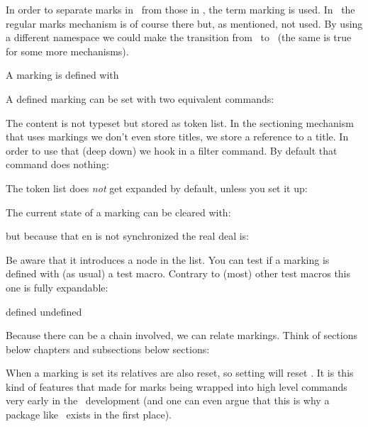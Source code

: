In order to separate marks in \CONTEXT\ from those in \TEX, the term \quote
{marking} is used. In \MKIV\ the regular marks mechanism is of course there but,
as mentioned, not used. By using a different namespace we could make the
transition from \MKII\ to \MKIV\ (the same is true for some more mechanisms).

A marking is defined with

\starttyping[option=TEX]
\stoptyping

A defined marking can be set with two equivalent commands:

\starttyping[option=TEX]
\stoptyping

The content is not typeset but stored as token list. In the sectioning mechanism
that uses markings we don't even store titles, we store a reference to a title.
In order to use that (deep down) we hook in a filter command. By default that command
does nothing:

\starttyping[option=TEX]
\setupmarking[MyMark][filtercommand=\firstofoneargument]
\stoptyping

The token list does {\em not} get expanded by default, unless you set it up:

\starttyping[option=TEX]
\setupmarking[MyMark][expansion=yes]
\stoptyping

The current state of a marking can be cleared with:

\starttyping[option=TEX]
\clearmarking[MyMark]
\stoptyping

but because that en is not synchronized the real deal is:

\starttyping[option=TEX]
\resetmarking[MyMark]
\stoptyping

Be aware that it introduces a node in the list. You can test if a marking is
defined with (as usual) a test macro. Contrary to (most) other test macros this
one is fully expandable:

\starttyping[option=TEX]
 {
    defined
} {
    undefined
}
\stoptyping

Because there can be a chain involved, we can relate markings. Think of sections
below chapters and subsections below sections:

\starttyping[option=TEX]
\relatemarking[MyMark][YourMark]
\stoptyping

When a marking is set its relatives are also reset, so setting 
will reset . It is this kind of features that made for marks being
wrapped into high level commands very early in the \CONTEXT\ development (and one
can even argue that this is why a package like \CONTEXT\ exists in the first
place).

